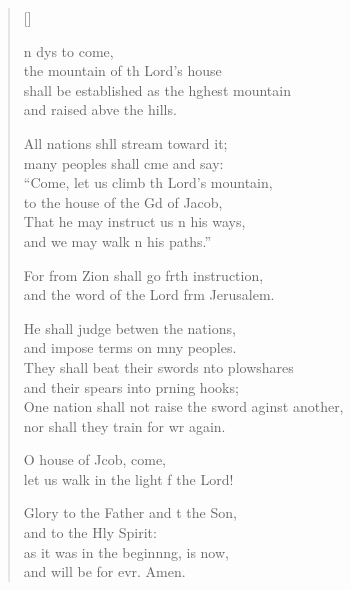 \settowidth{\versewidth}{One nation shall not raise the sword against another, *}
\begin{verse}[\versewidth]
  \begin{patverse}
n dys to come,\Med\\
the mountain of th Lord’s house\\
shall be established as the h\pointup{\i}ghest mountain\Med\\
and raised abve the hills.

All nations shll stream toward it;\Med\\
many peoples shall cme and say:\\
“Come, let us climb th Lord’s mountain,\Med\\
to the house of the Gd of Jacob,\\
That he may instruct us \pointup{\i}n his ways, \Med\\
and we may walk \pointup{\i}n his paths.”

For from Zion shall go frth instruction,\Med\\
and the word of the Lord frm Jerusalem.

He shall judge betwen the nations,\Med\\
and impose terms on mny peoples.\\
They shall beat their swords \pointup{\i}nto plowshares\Med\\
and their spears into prning hooks;\\
One nation shall not raise the sword aginst another,\Med\\
nor shall they train for wr again.

O house of Jcob, come,\Med\\
let us walk in the light f the Lord!

Glory to the Father and t the Son,\Med\\
    and to the Hly Spirit:\\
as it was in the beginn\pointup{\i}ng, is now,\Med\\
    and will be for evr. Amen.
  \end{patverse}
\end{verse}
